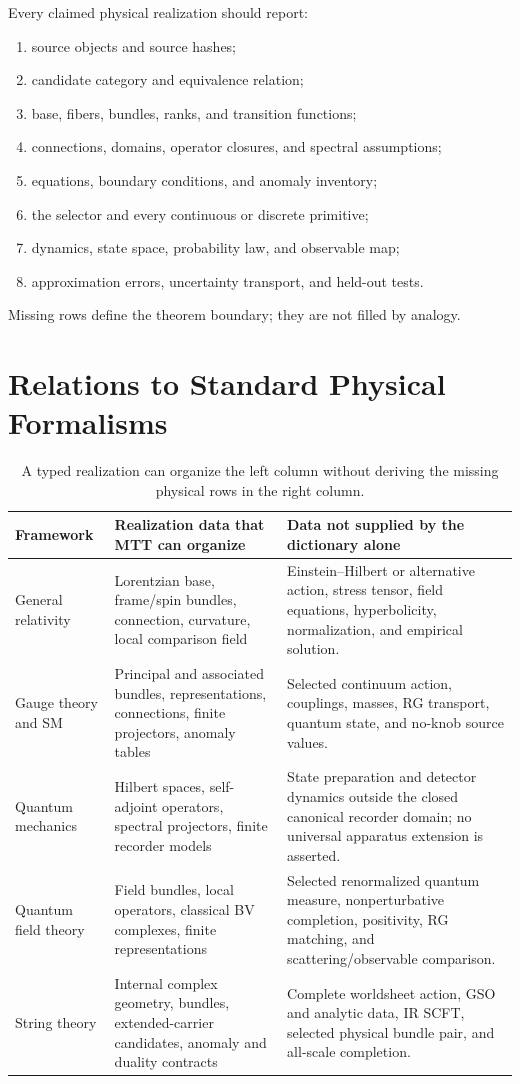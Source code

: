 \documentclass[11pt]{article}
\begin{document}
Every claimed physical realization should report:
\begin{enumerate}
\item source objects and source hashes;
\item candidate category and equivalence relation;
\item base, fibers, bundles, ranks, and transition functions;
\item connections, domains, operator closures, and spectral assumptions;
\item equations, boundary conditions, and anomaly inventory;
\item the selector and every continuous or discrete primitive;
\item dynamics, state space, probability law, and observable map;
\item approximation errors, uncertainty transport, and held-out tests.
\end{enumerate}
Missing rows define the theorem boundary; they are not filled by analogy.

\section{Relations to Standard Physical Formalisms}

\begin{table}[ht]
\centering
\small
\renewcommand{\arraystretch}{1.22}
\begin{tabularx}{\textwidth}{@{}P{0.14\textwidth}P{0.33\textwidth}Y@{}}
\hline
Framework & Realization data that MTT can organize & Data not supplied by the
dictionary alone \\
\hline
General relativity &
Lorentzian base, frame/spin bundles, connection, curvature, local comparison
field &
Einstein--Hilbert or alternative action, stress tensor, field equations,
hyperbolicity, normalization, and empirical solution. \\
Gauge theory and SM &
Principal and associated bundles, representations, connections, finite
projectors, anomaly tables &
Selected continuum action, couplings, masses, RG transport, quantum state,
and no-knob source values. \\
Quantum mechanics &
Hilbert spaces, self-adjoint operators, spectral projectors, finite recorder
models &
State preparation and detector dynamics outside the closed canonical
recorder domain; no universal apparatus extension is asserted. \\
Quantum field theory &
Field bundles, local operators, classical BV complexes, finite
representations &
Selected renormalized quantum measure, nonperturbative completion,
positivity, RG matching, and scattering/observable comparison. \\
String theory &
Internal complex geometry, bundles, extended-carrier candidates, anomaly and
duality contracts &
Complete worldsheet action, GSO and analytic data, IR SCFT, selected physical
bundle pair, and all-scale completion. \\
\hline
\end{tabularx}
\caption{A typed realization can organize the left column without deriving
the missing physical rows in the right column.}
\label{tab:physics}
\end{table}
\end{document}

